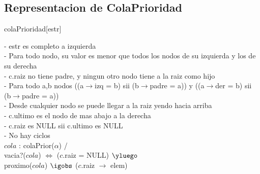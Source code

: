 \begin{Representacion}
\subsection{Representacion de ColaPrioridad}
 
\begin{Estructura}{colaPrioridad}[estr]
    \begin{Tupla}[estr]%
  \end{Tupla}
\end{Estructura}

\begin{Tupla}[nodo]
\end{Tupla}


	
- estr es completo a izquierda \\
- Para todo nodo, su valor es menor que todos los nodos de su izquierda y los de su derecha \\
- c.raiz no tiene padre, y ningun otro nodo tiene a la raiz como hijo \\
- Para todo a,b nodos  ((a$\to$izq = b) sii (b$\to$padre = a)) y ((a$\to$der = b) sii (b$\to$padre = a)) \\
- Desde cualquier nodo se puede llegar a la raiz yendo hacia arriba \\
- c.ultimo es el nodo de mas abajo a la derecha \\
- c.raiz es NULL sii c.ultimo es NULL \\
- No hay ciclos \\

%
{
$cola$ : colaPrior($\alpha$) / \\
	vacia?($cola$)  $\iff$  ($c$.raiz = NULL) $\yluego$ \\
	proximo($cola$) $\igobs$ ($c$.raiz $\to$ elem) \\
}%

\end{Representacion}
